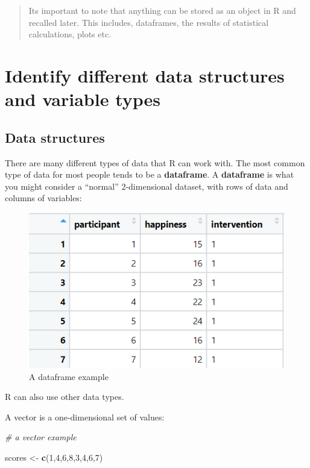 \documentclass[
]{book}
\newenvironment{Shaded}{\begin{snugshade}}{\end{snugshade}}
\newcommand{\CommentTok}[1]{\textcolor[rgb]{0.56,0.35,0.01}{\textit{#1}}}
\newcommand{\DecValTok}[1]{\textcolor[rgb]{0.00,0.00,0.81}{#1}}
\newcommand{\KeywordTok}[1]{\textcolor[rgb]{0.13,0.29,0.53}{\textbf{#1}}}
\newcommand{\NormalTok}[1]{#1}
\newcommand{\StringTok}[1]{\textcolor[rgb]{0.31,0.60,0.02}{#1}}
\begin{document}
\begin{quote}
Its important to note that anything can be stored as an object in R and recalled later. This includes, dataframes, the results of statistical calculations, plots etc.
\end{quote}

\hypertarget{identify-different-data-structures-and-variable-types}{%
\section{Identify different data structures and variable types}\label{identify-different-data-structures-and-variable-types}}

\hypertarget{data-structures}{%
\subsection{Data structures}\label{data-structures}}

There are many different types of data that R can work with. The most common type of data for most people tends to be a \textbf{dataframe}. A \textbf{dataframe} is what you might consider a ``normal'' 2-dimensional dataset, with rows of data and columns of variables:

\begin{figure}
\centering
\includegraphics{images/dataframe.png}
\caption{A dataframe example}
\end{figure}

R can also use other data types.

A vector is a one-dimensional set of values:

\begin{Shaded}
\begin{Highlighting}[]
\CommentTok{# a vector example}

\NormalTok{scores <-}\StringTok{ }\KeywordTok{c}\NormalTok{(}\DecValTok{1}\NormalTok{,}\DecValTok{4}\NormalTok{,}\DecValTok{6}\NormalTok{,}\DecValTok{8}\NormalTok{,}\DecValTok{3}\NormalTok{,}\DecValTok{4}\NormalTok{,}\DecValTok{6}\NormalTok{,}\DecValTok{7}\NormalTok{)}
\end{Highlighting}
\end{Shaded}
\end{document}
